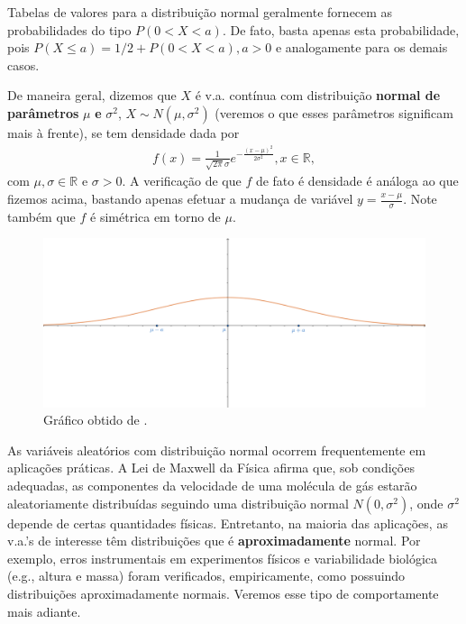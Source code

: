 \documentclass[../Notas.tex]{subfiles}
\begin{document}
\begin{example}
\begin{remark}
Tabelas de valores para a distribuição normal geralmente fornecem as probabilidades do tipo $P(0 < X < a)$. De fato, basta apenas esta probabilidade, pois $P(X\leq a) = 1/2 + P(0 < X < a), a>0$ e analogamente para os demais casos.
\end{remark}
De maneira geral, dizemos que $X$ é v.a. contínua com distribuição \textbf{normal de parâmetros} $\mu$ \textbf{e} $\sigma^2$, $X\sim N(\mu, \sigma^2)$ (veremos o que esses parâmetros significam mais à frente), se tem densidade dada por
\begin{align*}
    f(x) = \frac{1}{\sqrt{2\pi}\sigma}e^{-\frac{(x-\mu)^2}{2\sigma^2}}, x\in\mathbb{R},
\end{align*}
com $\mu,\sigma\in\mathbb{R}$ e $\sigma>0$. A verificação de que $f$ de fato é densidade é análoga ao que fizemos acima, bastando apenas efetuar a mudança de variável $y = \displaystyle{\frac{x-\mu}{\sigma}}$. Note também que $f$ é simétrica em torno de $\mu$.
\begin{figure}[H]
    \centering
    \includegraphics[width=\textwidth]{Imagens/p110.png}
    \caption{Gráfico obtido de \cite{Hoel}.}
\end{figure}
As variáveis aleatórios com distribuição normal ocorrem frequentemente em aplicações práticas. A Lei de Maxwell da Física afirma que, sob condições adequadas, as componentes da velocidade de uma molécula de gás estarão aleatoriamente distribuídas seguindo uma distribuição normal $N(0,\sigma^2)$, onde $\sigma^2$ depende de certas quantidades físicas. Entretanto, na maioria das aplicações, as v.a.'s de interesse têm distribuições que é \textbf{aproximadamente} normal. Por exemplo, erros instrumentais em experimentos físicos e variabilidade biológica (e.g., altura e massa) foram verificados, empiricamente, como possuindo distribuições aproximadamente normais. Veremos esse tipo de comportamente mais adiante.
\end{example}
\end{document}

